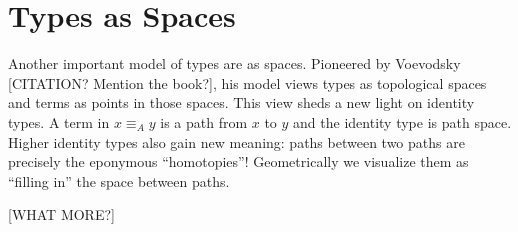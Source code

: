 \section{Types as Spaces}\label{sec:spaces}
Another important model of types are as spaces. Pioneered by Voevodsky
[CITATION? Mention the book?], his model views types as topological spaces and
terms as points in those spaces. This view sheds a new light on identity types.
A term in $x \equiv_A y$  is a path from $x$ to $y$ and the identity type is
path space. Higher identity types also gain new meaning: paths between two
paths are precisely the eponymous ``homotopies''! Geometrically we visualize
them as ``filling in'' the space between paths.

[WHAT MORE?]
